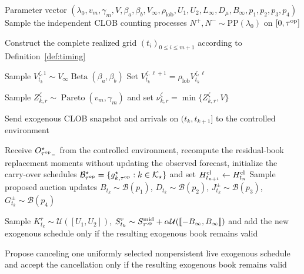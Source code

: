 \documentclass[11pt]{article}
\begin{document}
\begin{algorithm}[ht!]
\caption{Exogenous stochastic market generator}
\label{alg:generative_model}
\begin{algorithmic}[1]
\REQUIRE Parameter vector
$(\lambda_0,v_m,\gamma_m,V,\beta_a,\beta_b,V_\infty,
\rho_{\text{lob}},U_1,U_2,L_\infty,D_\mu, B_\infty,p_1,p_2,p_3,p_4)$
\STATE Sample the independent CLOB counting processes
$N^+,N^-\sim\mathrm{PP}(\lambda_0)$ on $[0,\tau^{\mathrm{op}}]$

\STATE Construct the complete realized grid
$(t_i)_{0\leqslant  i\leqslant  m+1}$ according to
Definition~\ref{def:timing}

    \FOR{$\zeta\in\{+,-\}$}
        \STATE Sample $V_{t_k}^{\zeta,1}
        \sim
        V_\infty\operatorname{Beta}(\beta_a,\beta_b)$
            \STATE Set $V_{t_k}^{\zeta,\ell+1}
            =
            \rho_{\text{lob}} V_{t_k}^{\zeta,\ell}$
        \ENDFOR

            \STATE Sample $Z_{k,r}^{\zeta}
            \sim
            \operatorname{Pareto}(v_m,\gamma_m)$ and set $\nu_{k,r}^{\zeta}
            =
            \min\{Z_{k,r}^{\zeta},V\}$
        \ENDFOR
    \ENDFOR

    \STATE Send exogenous CLOB snapshot and arrivals on $(t_k,t_{k+1}]$ to the controlled environment
\ENDFOR

\STATE Receive $O_{{\tau^{\mathrm{op}}}_-}^{\star}$ from the controlled environment, {recompute the residual-book replacement moments without updating the observed forecast}, initialize the carry-over schedules $\mathcal B_{\tau^{\mathrm{op}}}^{\star}
=
\{
g_{k,\tau^{\mathrm{op}}}^{\star}:
k\in\mathcal K_{\star}
\}$ and set $H_{t_{n+1}}^{\mathrm{cl}}\gets H_{t_n}^{\mathrm{cl}}$
    \STATE Sample proposed auction updates $B_{t_k}\sim\mathcal B(p_1)$, $D_{t_k}\sim\mathcal B(p_2)$, $J_{t_k}^{\pm}\sim\mathcal B(p_3)$, $G_{t_k}^{\pm}\sim\mathcal B(p_4)$

        \STATE Sample $K_{t_k}^r\sim\mathcal U([U_1,U_2])$, $S_{t_k}^r
        \sim
        S_{\tau^{\mathrm{op}}}^{\mathrm{mid}}
        +
        \alpha\mathcal U(\llbracket -B_\infty,B_\infty\rrbracket)$
        and add the new exogenous schedule only if the resulting exogenous book remains valid
    \ENDIF

        \STATE Propose canceling one uniformly selected nonpersistent live exogenous schedule and accept the cancellation only if the resulting exogenous book remains valid
    \ENDIF


\end{algorithmic}
\end{algorithm}
\end{document}
